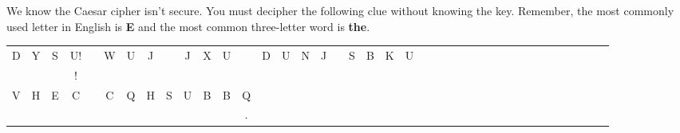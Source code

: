 \documentclass{article}
\begin{document}
We know the Caesar cipher isn't secure. You must decipher the following clue without knowing the key. Remember, the most commonly used letter in English is \textbf{E} and the most common three-letter word is \textbf{the}.

\vspace{5mm}

\begin{tabular}{*{39}{@{\hskip3pt}c}}
D & Y & S & U! &   & W & U & J &   & J & X & U &   & D & U & N & J &   & S & B & K & U \\
\underline{\hspace{.5cm}} & \underline{\hspace{.5cm}} & \underline{\hspace{.5cm}} & \underline{\hspace{.5cm}}! & 
\hspace{.3cm} & 
\underline{\hspace{.5cm}} & \underline{\hspace{.5cm}} & \underline{\hspace{.5cm}} & 
\hspace{.3cm} & 
\underline{\hspace{.5cm}} & \underline{\hspace{.5cm}} & \underline{\hspace{.5cm}} & 
\hspace{.3cm} &
\underline{\hspace{.5cm}} &  \underline{\hspace{.5cm}} & \underline{\hspace{.5cm}} & \underline{\hspace{.5cm}} & 
\hspace{.3cm} &
\underline{\hspace{.5cm}} & \underline{\hspace{.5cm}} & \underline{\hspace{.5cm}} & \underline{\hspace{.5cm}} \\
V & H & E & C &   & C & Q & H & S & U & B & B & Q \\
\underline{\hspace{.5cm}} & \underline{\hspace{.5cm}} & \underline{\hspace{.5cm}} & \underline{\hspace{.5cm}} &
\hspace{.3cm} &
\underline{\hspace{.5cm}} & \underline{\hspace{.5cm}} & \underline{\hspace{.5cm}} & \underline{\hspace{.5cm}} &
\underline{\hspace{.5cm}} & \underline{\hspace{.5cm}} & \underline{\hspace{.5cm}} & \underline{\hspace{.5cm}}. \\
\end{tabular}
\end{document}
